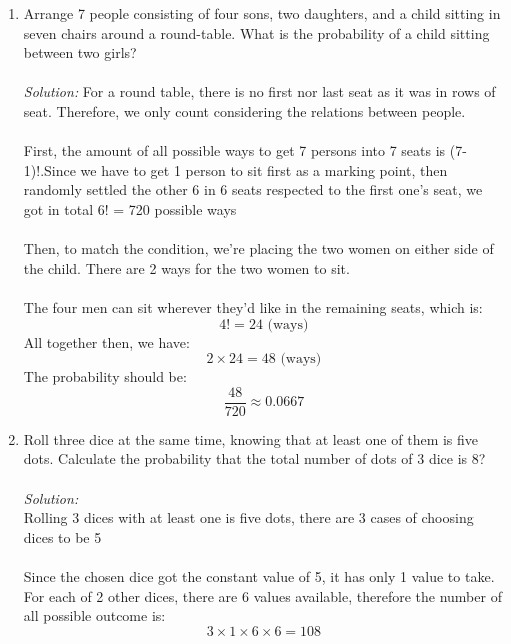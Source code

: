 \documentclass[a4paper]{article}
\begin{document}
\begin{enumerate}
	      
	\item Arrange 7 people consisting of four sons, two daughters, and a child sitting in seven chairs around a round-table. What is the probability of a child sitting between two girls?\\\\
	      \textit{Solution:}
	      For a round table, there is no first nor last seat as it was in rows of seat. Therefore, we only count considering the relations between people.\\\\
	      First, the amount of all possible ways to get 7 persons into 7 seats is (7-1)!.Since we have to get 1 person to sit first as a marking point, then randomly settled the other 6 in 6 seats respected to the first one's seat, we got in total 6! = 720 possible ways\\\\
	      Then, to match the condition, we're placing the two women on either side of the child. There are 2 ways for the two women to sit.\\\\
	      The four men can sit wherever they'd like in the remaining seats, which is: 
	      \begin{equation*}
		      4! = 24 \text{ (ways)}
	      \end{equation*}
	      All together then, we have: 
	      \begin{equation*}
		      2 \times 24 = 48 \text{ (ways)}
	      \end{equation*}
	      The probability should be: 
	      \begin{equation*}
		      \frac{48}{720} \approx 0.0667 
	      \end{equation*}
	\item Roll three dice at the same time, knowing that at least one of them is five dots. Calculate the probability that the total number of dots of 3 dice is 8?\\\\
	      \textit{Solution:} \\
	      Rolling 3 dices with at least one is five dots, there are 3 cases of choosing dices to be 5 \\\\
	      Since the chosen dice got the constant value of 5, it has only 1 value to take. For each of 2 other dices, there are 6 values available, therefore the number of all possible outcome is:
	      \begin{equation*}
		      3\times1\times6\times6 = 108

\end{equation*}
\end{enumerate}
\end{document}
